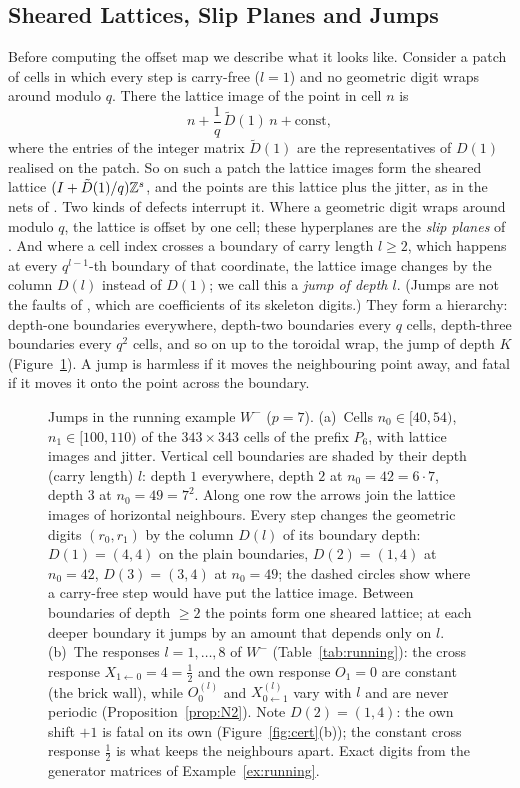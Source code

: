 \subsection{Sheared Lattices, Slip Planes and Jumps}\label{sec:dislocations}
Before computing the offset map we describe what it looks like. Consider a patch of cells in which every step is carry-free ($l=1$) and no geometric digit wraps around modulo $q$. There the lattice image of the point in cell $n$ is
\[
n+\frac1q\,\tilde D(1)\,n+\text{const},
\]
where the entries of the integer matrix $\tilde D(1)$ are the representatives of $D(1)$ realised on the patch. So on such a patch the lattice images form the sheared lattice $(I+\tilde D(1)/q)\mathbb{Z}^s$, and the points are this lattice plus the jitter, as in the nets of \cite{Gru26geo}. Two kinds of defects interrupt it. Where a geometric digit wraps around modulo $q$, the lattice is offset by one cell; these hyperplanes are the \emph{slip planes} of \cite{Gru26geo}. And where a cell index crosses a boundary of carry length $l\ge2$, which happens at every $q^{l-1}$-th boundary of that coordinate, the lattice image changes by the column $D(l)$ instead of $D(1)$; we call this a \emph{jump of depth $l$}. (Jumps are not the faults of \cite{Gru26geo}, which are coefficients of its skeleton digits.) They form a hierarchy: depth-one boundaries everywhere, depth-two boundaries every $q$ cells, depth-three boundaries every $q^2$ cells, and so on up to the toroidal wrap, the jump of depth $K$ (Figure~\ref{fig:hierarchy}). A jump is harmless if it moves the neighbouring point away, and fatal if it moves it onto the point across the boundary. %

\begin{figure}[t]
\centering
{}
\caption{Jumps in the running example $W^-$ ($p=7$). (a)~Cells $n_0\in[40,54)$, $n_1\in[100,110)$ of the $343\times343$ cells of the prefix $P_6$, with lattice images and jitter. Vertical cell boundaries are shaded by their depth (carry length) $l$: depth $1$ everywhere, depth $2$ at $n_0=42=6\cdot7$, depth $3$ at $n_0=49=7^2$. Along one row the arrows join the lattice images of horizontal neighbours. Every step changes the geometric digits $(r_0,r_1)$ by the column $D(l)$ of its boundary depth: $D(1)=(4,4)$ on the plain boundaries, $D(2)=(1,4)$ at $n_0=42$, $D(3)=(3,4)$ at $n_0=49$; the dashed circles show where a carry-free step would have put the lattice image. Between boundaries of depth $\ge2$ the points form one sheared lattice; at each deeper boundary it jumps by an amount that depends only on $l$. (b)~The responses $l=1,\dots,8$ of $W^-$ (Table~\ref{tab:running}): the cross response $X_{1\leftarrow0}=4=\frac12$ and the own response $O_1=0$ are constant (the brick wall), while $O_0^{(l)}$ and $X_{0\leftarrow1}^{(l)}$ vary with $l$ and are never periodic (Proposition~\ref{prop:N2}). Note $D(2)=(1,4)$: the own shift $+1$ is fatal on its own (Figure~\ref{fig:cert}(b)); the constant cross response $\frac12$ is what keeps the neighbours apart. Exact digits from the generator matrices of Example~\ref{ex:running}.}
\label{fig:hierarchy}
\end{figure}

